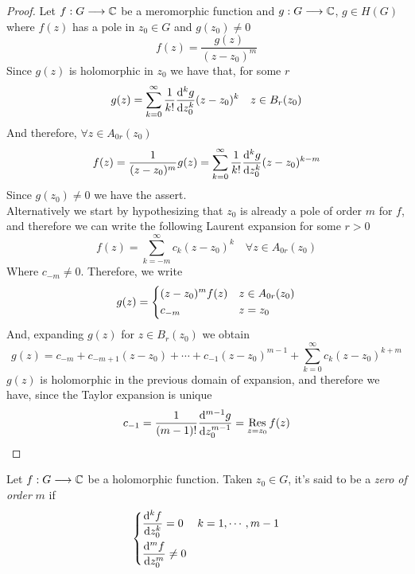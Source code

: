 \documentclass[../complete.tex]{subfiles}
\begin{document}
\begin{proof}
	Let $f:G\overset{}{\longrightarrow}\mathbb{C}$ be a meromorphic function and $g:G\overset{}{\longrightarrow}\mathbb{C}$, $g\in H(G)$ where $f(z)$ has a pole in $z_0\in G$ and $g(z_0)\ne0$
	\begin{equation*}
		f(z)=\frac{g(z)}{(z-z_0)^m}
	\end{equation*}
	Since $g(z)$ is holomorphic in $z_0$ we have that, for some $r$
	\begin{equation*}
		g(z)=\sum_{k=0}^{\infty}\frac{1}{k!}\derivative[k]{g}{z_0}{(z-z_0)^k}\quad z\in B_r(z_0)
	\end{equation*}
	And therefore, $\forall z\in A_{0r}(z_0)$
	\begin{equation*}
		f(z)=\frac{1}{(z-z_0)^m}g(z)=\sum_{k=0}^{\infty}\frac{1}{k!}\derivative[k]{g}{z_0}{(z-z_0)^{k-m}}
	\end{equation*}
	Since $g(z_0)\ne0$ we have the assert.\\
	Alternatively we start by hypothesizing that $z_0$ is already a pole of order $m$ for $f$, and therefore we can write the following Laurent expansion for some $r>0$
	\begin{equation*}
		f(z)=\sum_{k=-m}^\infty c_k(z-z_0)^k\quad\forall z\in A_{0r}(z_0)
	\end{equation*}
	Where $c_{-m}\ne0$. Therefore, we write
	\begin{equation*}
		g(z)=\begin{dcases}(z-z_0)^mf(z)&z\in A_{0r}(z_0)\\c_{-m}&z=z_0\end{dcases}
	\end{equation*}
	And, expanding $g(z)$ for $z\in B_r(z_0)$ we obtain
	\begin{equation*}
		g(z)=c_{-m}+c_{-m+1}(z-z_0)+\cdots+c_{-1}(z-z_0)^{m-1}+\sum_{k=0}^{\infty}c_k(z-z_0)^{k+m}
	\end{equation*}
	$g(z)$ is holomorphic in the previous domain of expansion, and therefore we have, since the Taylor expansion is unique
	\begin{equation*}
		c_{-1}=\frac{1}{(m-1)!}\derivative[m-1]{g}{z_0}=\res_{z=z_0}f(z)
	\end{equation*}
\end{proof}
\begin{dfn}[Zero]
	Let $f:G\overset{}{\longrightarrow}\mathbb{C}$ be a holomorphic function. Taken $z_0\in G$, it's said to be a \textit{zero of order} $m$ if
	\begin{equation*}
		\begin{dcases}\derivative[k]{f}{z_0}=0&k=1,\cdots,m-1\\\derivative[m]{f}{z_0}\ne0\end{dcases}
	\end{equation*}
\end{dfn}
\end{document}
